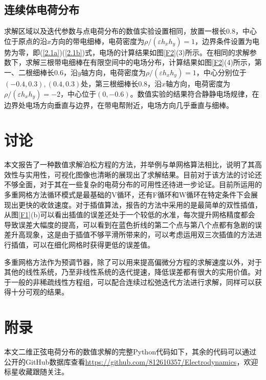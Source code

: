 \documentclass{article} %
\begin{document}
\subsection{连续体电荷分布}
求解区域以及迭代参数与点电荷分布的数值实验设置相同，放置一根长0.8，中心位于原点的沿$x$方向的带电细棒，电荷密度为$\rho/(\varepsilon h_x h_y)=1$，边界条件设置为电势为零，即(\ref{2.1a})(\ref{2.1b})式，电场的计算结果如图\ref{F2}(3)所示。在相同的求解参数下，求解三根带电细棒在有限空间中的电场分布，计算结果如图\ref{F2}(4)所示，第一、二根细棒长0.6，沿$y$轴方向，电荷密度为$\rho/(\varepsilon h_x h_y)=1$，中心分别位于$(-0.4,0.3),(0.4,0.3)$处，第三根细棒长0.8，沿$x$轴方向，电荷密度为$\rho/(\varepsilon h_x h_y)=-2$，中心位于$(0,-0.6)$。数值实验的结果符合静静电场规律，在边界处电场方向垂直与边界，在带电帮附近，电场方向几乎垂直与细棒。

\section{讨论}
本文报告了一种数值求解泊松方程的方法，并举例与单网格算法相比，说明了其高效性与实用性，可视化图像也清晰的展现出了求解结果。目前对于该方法的讨论还不够全面，对于其在一些复杂的电荷分布的可用性还待进一步论证。目前所运用的多重网格方法循环模式是最基础的V循环，还有F循环和W循环在特定条件下会展现出更快的收敛速度。对于插值算法，报告的方法中采用的是最简单的双性插值，从图\ref{F1}(b)可以看出插值的误差还处于一个较低的水准，每次提升网格精度都会导致误差大幅度的提高，可以看到在蓝色折线的第二个点与第八个点都有急剧的误差升高现象，这是由于插值不够平滑所带来的，可以考虑运用双三次插值的方法进行插值，可以在细化网格时获得更低的误差值。

多重网格方法作为预调节器，除了可以用来提高偏微分方程的求解速度以外，对于其他的线性系统，乃至非线性系统的迭代提速，降低误差都有很大的实用价值。对于一般的非稀疏线性方程组，可以配合连续过松弛迭代方法进行求解，同样可以获得十分可观的结果。

\section{附录}
本文二维正弦电荷分布的数值求解的完整Python代码如下，其余的代码可以通过公开的GitHub数据库查看\url{https://github.com/812610357/Electrodynamics}，欢迎标星收藏跟随关注。
\end{document}
